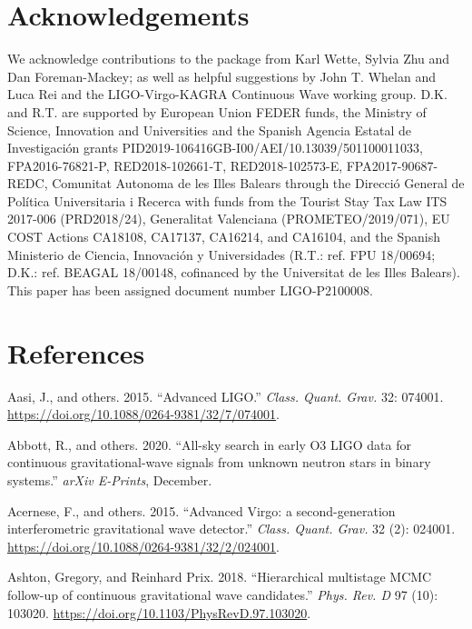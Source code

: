 \documentclass[10pt,a4paper,onecolumn]{article}
\let\textttOrig=\texttt
\def\texttt#1{\expandafter\textttOrig{\seqsplit{#1}}}
\let\addcontentslineOrig=\addcontentsline
\def\addcontentsline#1#2#3{\bgroup
  \let\texttt=\textttOrig\addcontentslineOrig{#1}{#2}{#3}\egroup}
\begin{document}
\hypertarget{acknowledgements}{%
\section{Acknowledgements}\label{acknowledgements}}

We acknowledge contributions to the package from Karl Wette, Sylvia Zhu
and Dan Foreman-Mackey; as well as helpful suggestions by John T. Whelan
and Luca Rei and the LIGO-Virgo-KAGRA Continuous Wave working group.
D.K. and R.T. are supported by European Union FEDER funds, the Ministry
of Science, Innovation and Universities and the Spanish Agencia Estatal
de Investigación grants PID2019-106416GB-I00/AEI/10.13039/501100011033,
FPA2016-76821-P, RED2018-102661-T, RED2018-102573-E, FPA2017-90687-REDC,
Comunitat Autonoma de les Illes Balears through the Direcció General de
Política Universitaria i Recerca with funds from the Tourist Stay Tax
Law ITS 2017-006 (PRD2018/24), Generalitat Valenciana
(PROMETEO/2019/071), EU COST Actions CA18108, CA17137, CA16214, and
CA16104, and the Spanish Ministerio de Ciencia, Innovación y
Universidades (R.T.: ref. FPU 18/00694; D.K.: ref. BEAGAL 18/00148,
cofinanced by the Universitat de les Illes Balears). This paper has been
assigned document number LIGO-P2100008.

\hypertarget{references}{%
\section*{References}\label{references}}

\hypertarget{refs}{}
\leavevmode\hypertarget{ref-TheLIGOScientific:2014jea}{}%
Aasi, J., and others. 2015. ``Advanced LIGO.'' \emph{Class. Quant.
Grav.} 32: 074001. \url{https://doi.org/10.1088/0264-9381/32/7/074001}.

\leavevmode\hypertarget{ref-Abbott:2020mev}{}%
Abbott, R., and others. 2020. ``All-sky search in early O3 LIGO data for
continuous gravitational-wave signals from unknown neutron stars in
binary systems.'' \emph{arXiv E-Prints}, December.

\leavevmode\hypertarget{ref-TheVirgo:2014hva}{}%
Acernese, F., and others. 2015. ``Advanced Virgo: a second-generation
interferometric gravitational wave detector.'' \emph{Class. Quant.
Grav.} 32 (2): 024001.
\url{https://doi.org/10.1088/0264-9381/32/2/024001}.

\leavevmode\hypertarget{ref-Ashton:2018ure}{}%
Ashton, Gregory, and Reinhard Prix. 2018. ``Hierarchical multistage MCMC
follow-up of continuous gravitational wave candidates.'' \emph{Phys.
Rev. D} 97 (10): 103020.
\url{https://doi.org/10.1103/PhysRevD.97.103020}.
\end{document}
